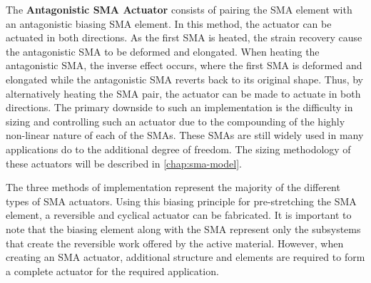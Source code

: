 The \textbf{Antagonistic SMA Actuator} consists of pairing the SMA element with an antagonistic biasing SMA element. In this method, the actuator can be actuated in both directions. As the first SMA is heated, the strain recovery cause the antagonistic SMA to be deformed and elongated. When heating the antagonistic SMA, the inverse effect occurs, where the first SMA is deformed and elongated while the antagonistic SMA reverts back to its original shape. Thus, by alternatively heating the SMA pair, the actuator can be made to actuate in both directions. The primary downside to such an implementation is the difficulty in sizing and controlling such an actuator due to the compounding of the highly non-linear nature of each of the SMAs. These SMAs are still widely used in many applications do to the additional degree of freedom. The sizing methodology of these actuators will be described in \cref{chap:sma-model}.

The three methods of implementation represent the majority of the different types of SMA actuators. Using this biasing principle for pre-stretching the SMA element, a reversible and cyclical actuator can be fabricated. It is important to note that the biasing element along with the SMA represent only the subsystems that create the reversible work offered by the active material. However, when creating an SMA actuator, additional structure and elements are required to form a complete actuator for the required application.

